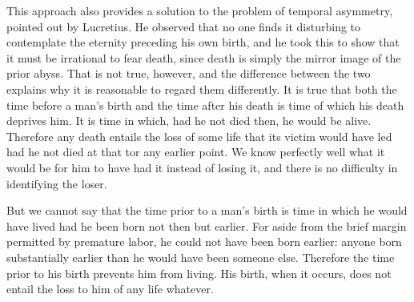 This approach also provides a solution to the problem of temporal asymmetry,
pointed out by Lucretius. He observed that no one finds it disturbing to
contemplate the eternity preceding his own birth, and he took this to show that
it must be irrational to fear death, since death is simply the mirror image of the
prior abyss. That is not true, however, and the difference between the two explains why it is reasonable to regard them differently. It is true that both the
time before a man's birth and the time after his death is time of which his death
deprives him. It is time in which, had he not died then, he would be alive.
Therefore any death entails the loss of some life that its victim would have led
had he not died at that tor any earlier point. We know perfectly well what it
would be for him to have had it instead of losing it, and there is no difficulty in
identifying the loser.

But we cannot say that the time prior to a man's birth is time in which he would
have lived had he been born not then but earlier. For aside from the brief margin
permitted by premature labor, he could not have been born earlier: anyone born
substantially earlier than he would have been someone else. Therefore the time
prior to his birth prevents him from living. His birth, when it occurs, does not
entail the loss to him of any life whatever.

